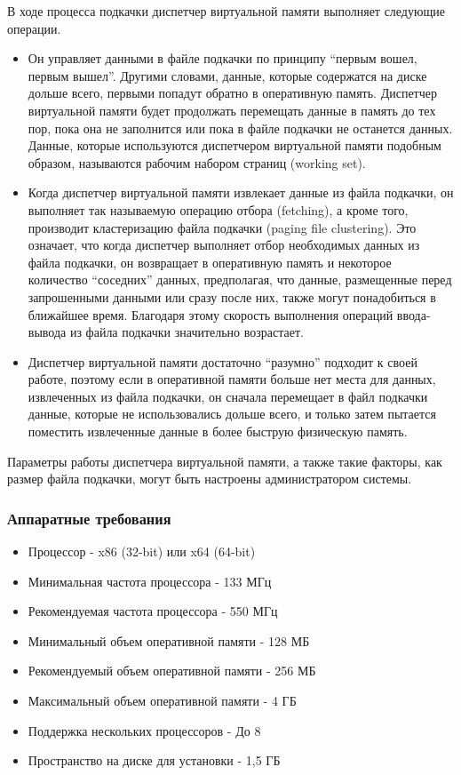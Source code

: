 В ходе процесса подкачки диспетчер виртуальной памяти выполняет следующие операции.
\begin{itemize}
\item Он управляет данными в файле подкачки по принципу “первым вошел, первым вышел”. Другими словами, данные, которые содержатся на диске дольше всего, первыми попадут обратно в оперативную память. Диспетчер виртуальной памяти будет продолжать перемещать данные в память до тех пор, пока она не заполнится или пока в файле подкачки не останется данных. Данные, которые используются диспетчером виртуальной памяти подобным образом, называются рабочим набором страниц (working set).
\item Когда диспетчер виртуальной памяти извлекает данные из файла подкачки, он выполняет так называемую операцию отбора (fetching), а кроме того, производит кластеризацию файла подкачки (paging file clustering). Это означает, что когда диспетчер выполняет отбор необходимых данных из файла подкачки, он возвращает в оперативную память и некоторое количество “соседних” данных, предполагая, что данные, размещенные перед запрошенными данными или сразу после них, также могут понадобиться в ближайшее время. Благодаря этому скорость выполнения операций ввода-вывода из файла подкачки значительно возрастает.
\item Диспетчер виртуальной памяти достаточно “разумно” подходит к своей работе, поэтому если в оперативной памяти больше нет места для данных, извлеченных из файла подкачки, он сначала перемещает в файл подкачки данные, которые не использовались дольше всего, и только затем пытается поместить извлеченные данные в более быструю физическую память.
\end{itemize}
Параметры работы диспетчера виртуальной памяти, а также такие факторы, как размер файла подкачки, могут быть настроены администратором системы.

\subsubsection{Аппаратные требования}
\begin{itemize}
\item Процессор - x86 (32-bit) или x64 (64-bit)
\item Минимальная частота процессора - 133 МГц
\item Рекомендуемая частота процессора - 550 МГц
\item Минимальный объем оперативной памяти - 128 МБ
\item Рекомендуемый объем оперативной памяти - 256 МБ
\item Максимальный объем оперативной памяти - 4 ГБ
\item Поддержка нескольких процессоров - До 8
\item Пространство на диске для установки - 1,5 ГБ
\end{itemize}



